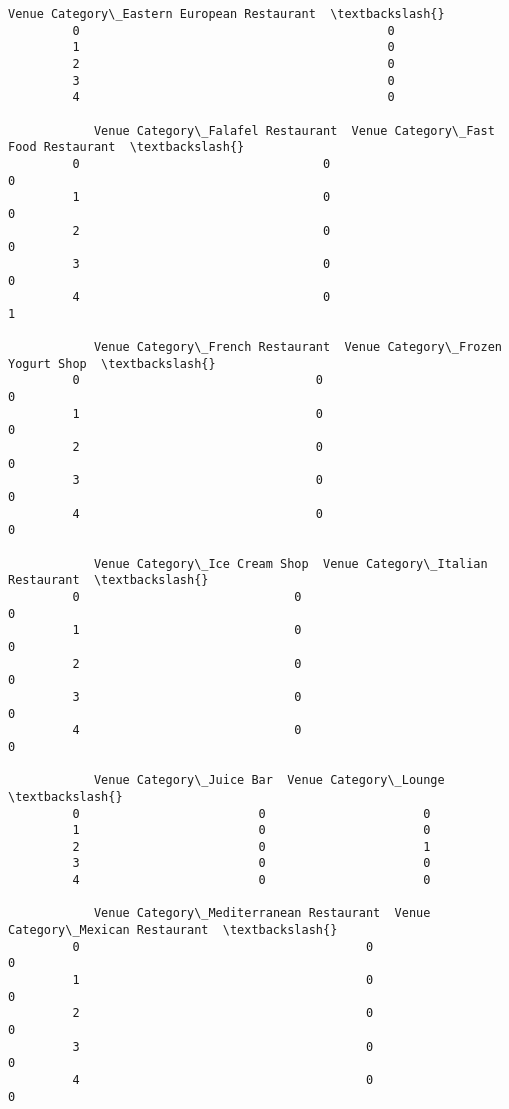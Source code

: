 \documentclass[11pt]{article}
\begin{document}
\begin{Verbatim}[commandchars=\\\{\}]
            Venue Category\_Eastern European Restaurant  \textbackslash{}
         0                                           0   
         1                                           0   
         2                                           0   
         3                                           0   
         4                                           0   
         
            Venue Category\_Falafel Restaurant  Venue Category\_Fast Food Restaurant  \textbackslash{}
         0                                  0                                    0   
         1                                  0                                    0   
         2                                  0                                    0   
         3                                  0                                    0   
         4                                  0                                    1   
         
            Venue Category\_French Restaurant  Venue Category\_Frozen Yogurt Shop  \textbackslash{}
         0                                 0                                  0   
         1                                 0                                  0   
         2                                 0                                  0   
         3                                 0                                  0   
         4                                 0                                  0   
         
            Venue Category\_Ice Cream Shop  Venue Category\_Italian Restaurant  \textbackslash{}
         0                              0                                  0   
         1                              0                                  0   
         2                              0                                  0   
         3                              0                                  0   
         4                              0                                  0   
         
            Venue Category\_Juice Bar  Venue Category\_Lounge  \textbackslash{}
         0                         0                      0   
         1                         0                      0   
         2                         0                      1   
         3                         0                      0   
         4                         0                      0   
         
            Venue Category\_Mediterranean Restaurant  Venue Category\_Mexican Restaurant  \textbackslash{}
         0                                        0                                  0   
         1                                        0                                  0   
         2                                        0                                  0   
         3                                        0                                  0   
         4                                        0                                  0   
         

\end{Verbatim}
\end{document}
